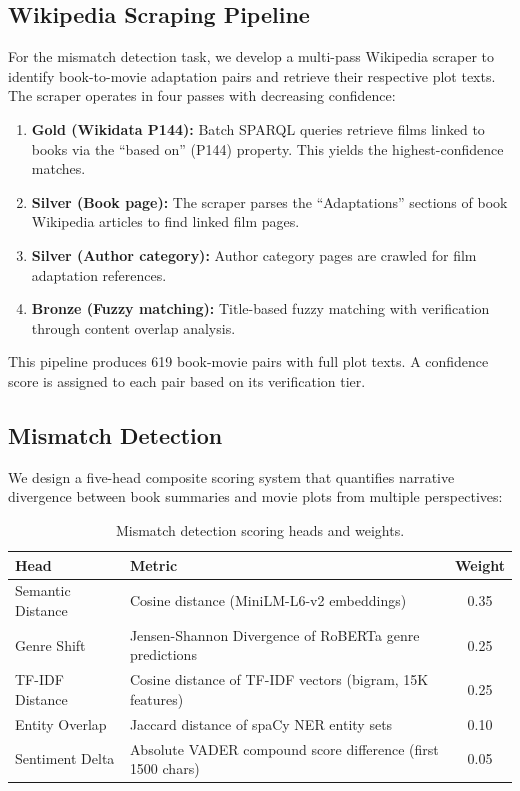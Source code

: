 \documentclass[11pt,a4paper]{article}
\begin{document}
\subsection{Wikipedia Scraping Pipeline}

For the mismatch detection task, we develop a multi-pass Wikipedia scraper to identify book-to-movie adaptation pairs and retrieve their respective plot texts. The scraper operates in four passes with decreasing confidence:

\begin{enumerate}[nosep]
    \item \textbf{Gold (Wikidata P144):} Batch SPARQL queries retrieve films linked to books via the ``based on'' (P144) property. This yields the highest-confidence matches.
    \item \textbf{Silver (Book page):} The scraper parses the ``Adaptations'' sections of book Wikipedia articles to find linked film pages.
    \item \textbf{Silver (Author category):} Author category pages are crawled for film adaptation references.
    \item \textbf{Bronze (Fuzzy matching):} Title-based fuzzy matching with verification through content overlap analysis.
\end{enumerate}

This pipeline produces 619 book-movie pairs with full plot texts. A confidence score is assigned to each pair based on its verification tier.

\subsection{Mismatch Detection}

We design a five-head composite scoring system that quantifies narrative divergence between book summaries and movie plots from multiple perspectives:

\begin{table}[H]
\centering
\caption{Mismatch detection scoring heads and weights.}
\label{tab:heads}
\begin{tabular}{llc}
\toprule
\textbf{Head} & \textbf{Metric} & \textbf{Weight} \\
\midrule
Semantic Distance   & Cosine distance (MiniLM-L6-v2 embeddings) & 0.35 \\
Genre Shift         & Jensen-Shannon Divergence of RoBERTa genre predictions & 0.25 \\
TF-IDF Distance     & Cosine distance of TF-IDF vectors (bigram, 15K features) & 0.25 \\
Entity Overlap      & Jaccard distance of spaCy NER entity sets & 0.10 \\
Sentiment Delta     & Absolute VADER compound score difference (first 1500 chars) & 0.05 \\
\bottomrule
\end{tabular}
\end{table}
\end{document}
